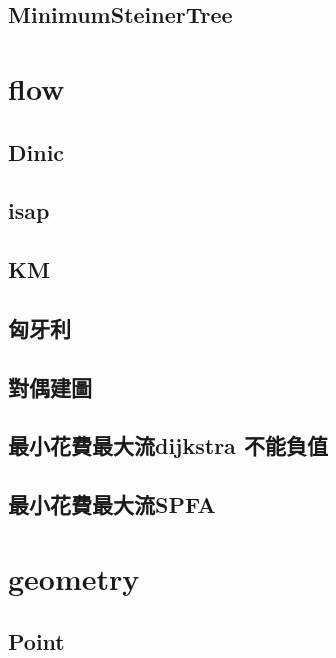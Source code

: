\documentclass[a4paper,10pt,twocolumn,oneside]{article}
\begin{document}
    \subsection{MinimumSteinerTree}
    

\section{flow}
    \subsection{Dinic}
    

    \subsection{isap}
    

    \subsection{KM}
    

    \subsection{匈牙利}
    

    \subsection{對偶建圖}
    

    \subsection{最小花費最大流dijkstra 不能負值}
    

    \subsection{最小花費最大流SPFA}
    

\section{geometry}
    \subsection{Point}
    
\end{document}

